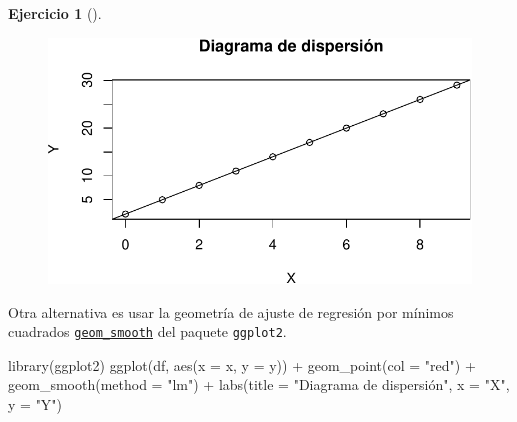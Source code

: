 \documentclass[
  a4paper,
]{scrreport}
\newenvironment{Shaded}{\begin{snugshade}}{\end{snugshade}}
\newcommand{\AttributeTok}[1]{\textcolor[rgb]{0.40,0.45,0.13}{#1}}
\newcommand{\FunctionTok}[1]{\textcolor[rgb]{0.28,0.35,0.67}{#1}}
\newcommand{\NormalTok}[1]{\textcolor[rgb]{0.00,0.23,0.31}{#1}}
\newcommand{\SpecialCharTok}[1]{\textcolor[rgb]{0.37,0.37,0.37}{#1}}
\newcommand{\StringTok}[1]{\textcolor[rgb]{0.13,0.47,0.30}{#1}}
\theoremstyle{definition}
\newtheorem{exercise}{Ejercicio}[chapter]
\theoremstyle{remark}
\begin{document}
\begin{exercise}[]
\begin{enumerate}
\begin{tcolorbox}
  \begin{figure}[H]

  {\centering \includegraphics{05-regresion_files/figure-pdf/unnamed-chunk-6-1.pdf}

  }

  \end{figure}

  \end{tcolorbox}

  \begin{tcolorbox}[enhanced jigsaw, coltitle=black, left=2mm, colback=white, leftrule=.75mm, toptitle=1mm, breakable, bottomrule=.15mm, titlerule=0mm, bottomtitle=1mm, title=\textcolor{quarto-callout-tip-color}{\faLightbulb}\hspace{0.5em}{Solución 2}, arc=.35mm, toprule=.15mm, rightrule=.15mm, colframe=quarto-callout-tip-color-frame, opacityback=0, colbacktitle=quarto-callout-tip-color!10!white, opacitybacktitle=0.6]

  Otra alternativa es usar la geometría de ajuste de regresión por
  mínimos cuadrados
  \href{https://aprendeconalf.es/manual-r/07-graficos.html\#interpolaci\%C3\%B3n-y-ajustes-de-regresi\%C3\%B3n}{\texttt{geom\_smooth}}
  del paquete \texttt{ggplot2}.

\begin{Shaded}
\begin{Highlighting}[]
\FunctionTok{library}\NormalTok{(ggplot2)}
\FunctionTok{ggplot}\NormalTok{(df, }\FunctionTok{aes}\NormalTok{(}\AttributeTok{x =}\NormalTok{ x, }\AttributeTok{y =}\NormalTok{ y)) }\SpecialCharTok{+}
    \FunctionTok{geom\_point}\NormalTok{(}\AttributeTok{col =} \StringTok{"red"}\NormalTok{) }\SpecialCharTok{+}
    \FunctionTok{geom\_smooth}\NormalTok{(}\AttributeTok{method =} \StringTok{"lm"}\NormalTok{) }\SpecialCharTok{+}
    \FunctionTok{labs}\NormalTok{(}\AttributeTok{title =} \StringTok{"Diagrama de dispersión"}\NormalTok{, }\AttributeTok{x =} \StringTok{"X"}\NormalTok{, }\AttributeTok{y =} \StringTok{"Y"}\NormalTok{)}
\end{Highlighting}
\end{Shaded}


\end{tcolorbox}
\end{enumerate}
\end{exercise}
\end{document}

